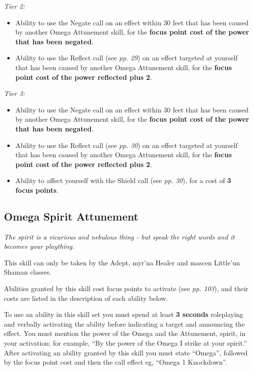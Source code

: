 \documentclass{scrbook}
\begin{document}
\textit{Tier 2:}

\begin{itemize}
\item Ability to use the Negate call on an effect within 30 feet that has been caused by another Omega Attunement skill, for the \textbf{focus point cost of the power that has been negated}.

\item Ability to use the Reflect call (see \textit{pp. 29}) on an effect targeted at yourself that has been caused by another Omega Attunement skill, for the \textbf{focus point cost of the power reflected plus 2}.

\end{itemize}
\textit{Tier 3:}

\begin{itemize}
\item Ability to use the Negate call on an effect within 30 feet that has been caused by another Omega Attunement skill, for the \textbf{focus point cost of the power that has been negated}.

\item Ability to use the Reflect call (see \textit{pp. 30}) on an effect targeted at yourself that has been caused by another Omega Attunement skill, for the \textbf{focus point cost of the power reflected plus 2}.

\item Ability to affect yourself with the Shield call (see \textit{pp. 30}), for a cost of \textbf{3 focus points}.

\end{itemize}
\subsection{Omega Spirit Attunement}

\textit{The spirit is a vicarious and nebulous thing - but speak the right words and it becomes your plaything.}

This skill can only be taken by the Adept, myr'na Healer and mascen Little'un Shaman classes.

Abilities granted by this skill cost focus points to activate (see \textit{pp. 103}), and their costs are listed in the description of each ability below.

To use an ability in this skill set you must spend at least \textbf{3 seconds} roleplaying and verbally activating the ability before indicating a target and announcing the effect. You must mention the power of the Omega and the Attunement, spirit, in your activation; for example, ``By the power of the Omega I strike at your spirit.'' After activating an ability granted by this skill you must state ``Omega'', followed by the focus point cost and then the call effect eg, ``Omega 1 Knockdown''.
\end{document}
